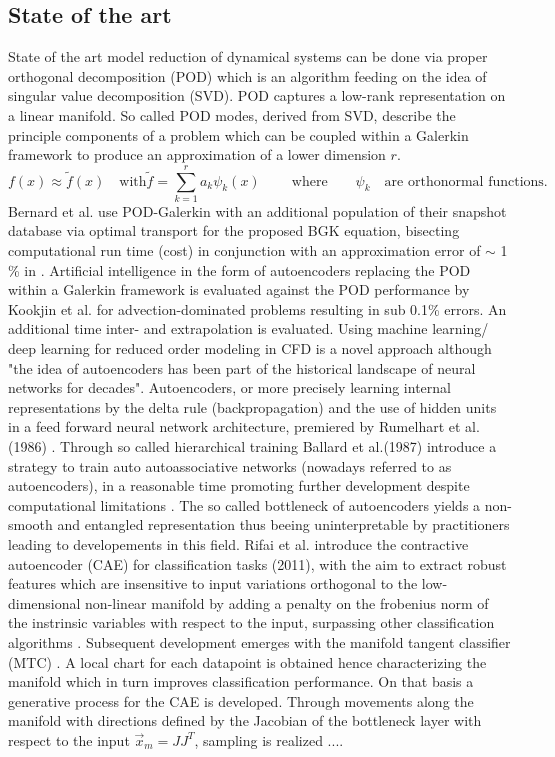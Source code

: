 \documentclass[12pt, a4paper]{article}
\begin{document}
\subsection{State of the art}
State of the art model reduction of dynamical systems can be done via proper orthogonal decomposition (POD) which is an algorithm feeding on the idea of singular value decomposition (SVD)\cite{Franz}\cite{Kutz}. POD captures a low-rank representation on a linear manifold. So called POD modes, derived from SVD, describe the principle components of a problem which can be coupled within a Galerkin framework to produce an approximation of a lower dimension \(r\). 
\begin{equation}
	f(x)\approx \tilde{f}(x) \quad\textrm{with}\tilde{f}=\sum_{k=1}^r a_k \psi_k(x)  \qquad\ \textrm{where}\qquad \psi_k\quad \textrm{are orthonormal functions.}
\end{equation}
Bernard et al. use POD-Galerkin with an additional population of their snapshot database via optimal transport for the proposed BGK equation, bisecting computational run time (cost) in conjunction with an approximation error of \(\sim\) 1 \% in \cite{Bernard}. Artificial intelligence in the form of autoencoders replacing the POD within a Galerkin framework is evaluated against the POD performance by Kookjin et al. for advection-dominated problems\cite{Carlberg} resulting in sub 0.1\% errors. An additional time inter- and extrapolation is evaluated. Using machine learning/ deep learning for reduced order modeling in CFD is a novel approach although "the idea of autoencoders has been part of the historical landscape of neural networks for decades"\cite[p.493]{Goodfellow}. Autoencoders, or more precisely learning internal representations by the delta rule (backpropagation) and the use of hidden units in a feed forward neural network architecture, premiered by Rumelhart et al. (1986) \cite{Rumelhart}.  Through so called hierarchical training Ballard et al.(1987) introduce a strategy to train auto autoassociative networks (nowadays referred to as autoencoders), in a reasonable time promoting further development despite computational limitations \cite{Ballard}. The so called bottleneck of autoencoders yields a non-smooth and entangled representation thus beeing uninterpretable by practitioners\cite{Rifai2011} leading to developements in this field. Rifai et al. introduce the contractive autoencoder (CAE) for classification tasks (2011), with the aim to extract robust features which are insensitive to input variations orthogonal to the low-dimensional non-linear manifold by adding a penalty on the frobenius norm of the instrinsic variables with respect to the input, surpassing other classification algorithms \cite{Rifai2011}. Subsequent development emerges with the manifold tangent classifier (MTC) \cite{Rifai_2011a}. A local chart for each datapoint is obtained hence characterizing the manifold  which in turn improves classification performance. On that basis a generative process for the CAE is developed. Through movements along the manifold with directions defined by the Jacobian of the bottleneck layer with respect to the input \begin{math}	\vec{x}_m=JJ^T \end{math}, sampling is realized \cite{rifai2012generative}....
\end{document}
